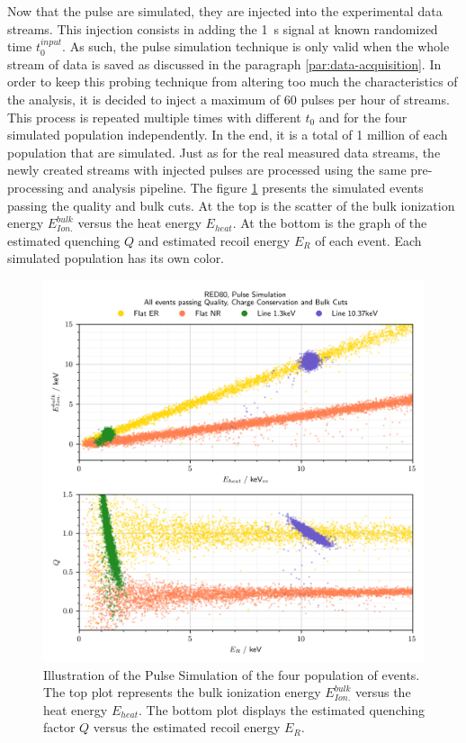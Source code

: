 Now that the pulse are simulated, they are injected into the experimental data streams. This injection consists in adding the \SI{1}{\s} signal at known randomized time $t_0^{input}$. As such, the pulse simulation technique is only valid when the whole stream of data is saved as discussed in the paragraph \ref{par:data-acquisition}. In order to keep this probing technique from altering too much the characteristics of the analysis, it is decided to inject a maximum of 60 pulses per hour of streams. This process is repeated multiple times with different $t_0$ and for the four simulated population independently. In the end, it is a total of 1 million of each population that are simulated. Just as for the real measured data streams, the newly created streams with injected pulses are processed using the same pre-processing and analysis pipeline.
The figure \ref{fig:band-cut-ecei-simu} presents the simulated events passing the quality and bulk cuts. At the top is the scatter of the bulk ionization energy $E_{Ion.}^{bulk}$ versus the heat energy $E_{heat}$. At the bottom is the graph of the estimated quenching $Q$ and estimated recoil energy $E_R$ of each event. Each simulated population has its own color.

\begin{figure}
\centering
\includegraphics[scale=1]{Figures/Neutron/pulse_simulation.png}
\caption{Illustration of the Pulse Simulation of the four population of events. The top plot represents the bulk ionization energy $E_{Ion.}^{bulk}$ versus the heat energy $E_{heat}$. The bottom plot displays the estimated quenching factor $Q$ versus the estimated recoil energy $E_R$.}
\label{fig:band-cut-ecei-simu}
\end{figure}

